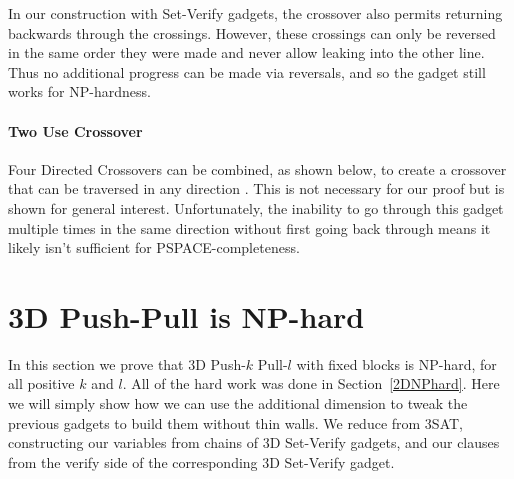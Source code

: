 In our construction with Set-Verify gadgets, the crossover also permits returning backwards through the crossings. However, these crossings can only be reversed in the same order they were made and never allow leaking into the other line. Thus no additional progress can be made via reversals, and so the gadget still works for NP-hardness.
%
\paragraph{Two Use Crossover} 
Four Directed Crossovers can be combined, as shown below, to create a crossover that can be traversed in any direction \cite{Push100}. This is not necessary for our proof but is shown for general interest. Unfortunately, the inability to go through this gadget multiple times in the same direction without first going back through means it likely isn't sufficient for PSPACE-completeness. 

\section{3D Push-Pull is NP-hard}
\label{3DNPhard}
In this section we prove that 3D Push-$k$ Pull-$l$ with fixed blocks is NP-hard, for all positive $k$ and $l$. All of the hard work was done in Section~\ref{2DNPhard}. Here we will simply show how we can use the additional dimension to tweak the previous gadgets to build them without thin walls. We reduce from 3SAT, constructing our variables from chains of 3D Set-Verify gadgets, and our clauses from the verify side of the corresponding 3D Set-Verify gadget.

